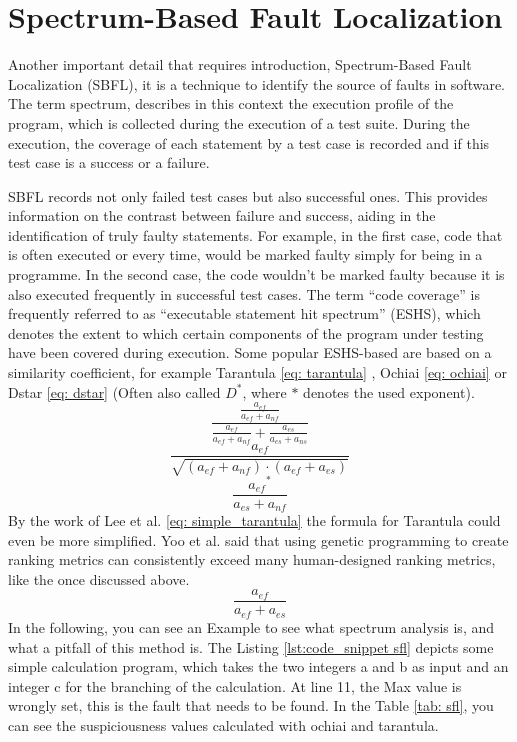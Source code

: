 \section{Spectrum-Based Fault Localization}\label{sec:spectrum-analysis}
Another important detail that requires introduction, Spectrum-Based Fault Localization (SBFL)\cite{wong_handbook_2023}, it is a technique to identify the source of faults in software.
The term spectrum, describes in this context the execution profile of the program, which is collected during the execution of a test suite.
During the execution, the coverage of each statement by a test case is recorded and if this test case is a success or a failure.

SBFL records not only failed test cases but also successful ones.
This provides information on the contrast between failure and success, aiding in the identification of truly faulty statements.
For example, in the first case, code that is often executed or every time, would be marked faulty simply for being in a programme.
In the second case, the code wouldn't be marked faulty because it is also executed frequently in successful test cases.
The term “code coverage” is frequently referred to as “executable statement hit spectrum” (ESHS), which denotes the extent to which certain components of the program under testing have been covered during execution.
Some popular ESHS-based are based on a similarity coefficient, for example Tarantula\cite{jones_empirical_2005} \ref{eq: tarantula} , Ochiai\cite{ochiai_zoogeographical_1957} \ref{eq: ochiai} or Dstar\cite{wong_dstar_2014} \ref{eq: dstar} (Often also called $D^*$, where $*$ denotes the used exponent).
\begin{equation}
    \frac{\frac{a_{ef}}{a_{ef} + a_{nf}}}{\frac{a_{ef}}{a_{ef} + a_{nf}}+\frac{a_{es}}{a_{es} + a_{ns}}}
    \label{eq: tarantula}
\end{equation}
\begin{equation}
    \frac{a_{ef}}{\sqrt{(a_{ef}+a_{nf})\cdot(a_{ef}+a_{es})}}
    \label{eq: ochiai}
\end{equation}
\begin{equation}
    \frac{{a_{ef}}^*}{a_{es}+a_{nf}}
    \label{eq: dstar}
\end{equation}
By the work of Lee et al. \cite{hua_jie_lee_study_2009} \ref{eq: simple_tarantula} the formula for Tarantula could even be more simplified.
Yoo et al. \cite{yoo_human_2017}said that using genetic programming to create ranking metrics can consistently exceed many human-designed ranking metrics, like the once discussed above.
\begin{equation}
    \frac{a_{ef}}{a_{ef}+a_{es}}
    \label{eq: simple_tarantula}
\end{equation}
In the following, you can see an Example \cite{parsa_software_2023} to see what spectrum analysis is, and what a pitfall of this method is.
The Listing \ref{lst:code_snippet sfl} depicts some simple calculation program, which takes the two integers a and b as input and an integer c for the branching of the calculation.
At line 11, the Max value is wrongly set, this is the fault that needs to be found.
In the Table \ref{tab: sfl}, you can see the suspiciousness values calculated with ochiai and tarantula.

